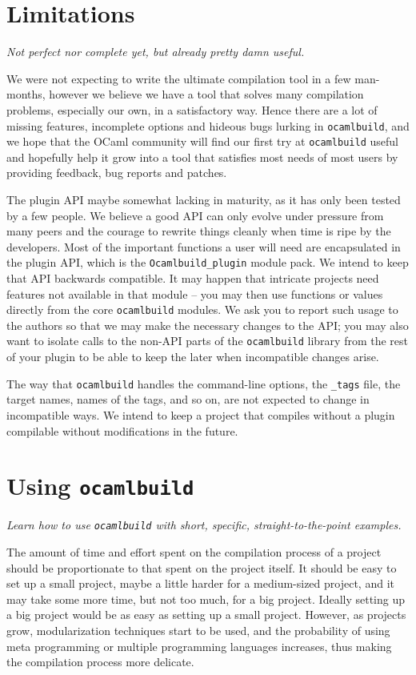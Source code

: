 \documentclass[9pt]{article}
\newcommand{\ocb}{\texttt{ocamlbuild}\xspace}
\newcommand{\tags}{\texttt{\_tags}\xspace}
\begin{document}
\section{Limitations}
{\em Not perfect nor complete yet, but already pretty damn useful.}

We were not expecting to write the ultimate compilation tool in a few man-months, however we believe we have
a tool that solves many compilation problems, especially our own, in a satisfactory way.  Hence there are a
lot of missing features, incomplete options and hideous bugs lurking in \ocb, and we hope that the OCaml community
will find our first try at \ocb useful and hopefully help it grow into a tool that satisfies most needs of most users
by providing feedback, bug reports and patches.

The plugin API maybe somewhat lacking in maturity, as it has only been tested
by a few people.  We believe a good API can only evolve under pressure from
many peers and the courage to rewrite things cleanly when time is ripe by the
developers.  Most of the important functions a user will need are encapsulated
in the plugin API, which is the \texttt{Ocamlbuild\_plugin} module pack.  We
intend to keep that API backwards compatible.  It may happen that intricate
projects need features not available in that module -- you may then use
functions or values directly from the core \ocb modules.  We ask you to report
such usage to the authors so that we may make the necessary changes to the API;
you may also want to isolate calls to the non-API parts of the \ocb library
from the rest of your plugin to be able to keep the later when incompatible
changes arise.

The way that \ocb handles the command-line options, the \tags file,
the target names, names of the tags, and so on, are not expected to change in
incompatible ways.  We intend to keep a project that compiles without a plugin
compilable without modifications in the future.
\section{Using \ocb}
{\em Learn how to use \ocb with short, specific, straight-to-the-point examples.}

The amount of time and effort spent on the compilation process of a project
should be proportionate to that spent on the project itself.  It should be easy
to set up a small project, maybe a little harder for a medium-sized project,
and it may take some more time, but not too much, for a big project.  Ideally
setting up a big project would be as easy as setting up a small project.  However,
as projects grow, modularization techniques start to be used, and the probability
of using meta programming or multiple programming languages increases, thus making
the compilation process more delicate.
\end{document}
